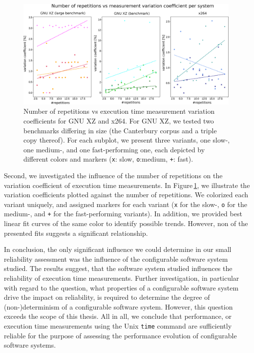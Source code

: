 \begin{figure}
\centering
\includegraphics[width=0.99\textwidth]{images/reliability_3.eps}
\caption{Number of repetitions vs execution time measurement variation
coefficients for GNU XZ and x264. For GNU XZ, we tested two benchmarks
differing in size (the Canterbury corpus and a triple copy thereof). For each
subplot, we present three variants, one slow-, one medium-, and one
fast-performing one, each depicted by different colors and markers (\texttt{x}:
slow, \texttt{o}:medium, \texttt{+}: fast).}\label{fig:reliability_3}
\end{figure}

Second, we investigated the influence of the number of repetitions on the
variation coefficient of execution time measurements. In
Figure\,\ref{fig:reliability_3}, we illustrate the variation coefficients
plotted against the number of repetitions. We colorized each variant uniquely,
and assigned markers for each variant (\texttt{x} for the slow-,
{\texttt{o}} for the medium-, and \texttt{+} for the fast-performing variants).
In addition, we provided best linear fit curves of the same color to identify possible
trends. However, non of the presented fits suggests a significant relationship.

In conclusion, the only significant influence we could determine in our small
reliability assessment was the influence of the configurable software system
studied. The results suggest, that the software system studied influences the
reliability of execution time measurements. Further investigation, in particular
with regard to the question, what properties of a configurable software system
drive the impact on reliability, is required to determine the degree of
(non-)determinism of a configurable software system. However, this question
exceeds the scope of this thesis. All in all, we conclude that performance, or
execution time measurements using the Unix \texttt{time} command are sufficiently
reliable for the purpose of assessing the performance evolution of configurable
software systems.



